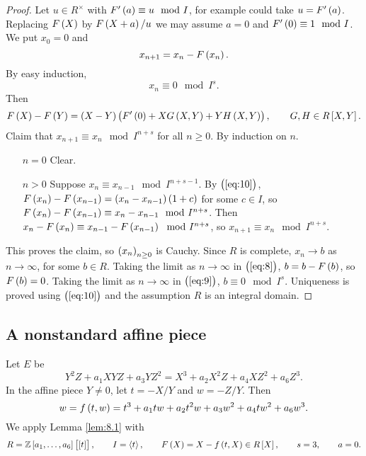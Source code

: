 \begin{proof}
Let $ u \in R^\times $ with $ F'\br{a} \equiv u \mod I $, for example could take $ u = F'\br{a} $. Replacing $ F\br{X} $ by $ F\br{X + a} / u $ we may assume $ a = 0 $ and $ F'\br{0} \equiv 1 \mod I $. We put $ x_0 = 0 $ and
\begin{equation}
\label{eq:8}
x_{n + 1} = x_n - F\br{x_n}.
\end{equation}
By easy induction,
\begin{equation}
\label{eq:9}
x_n \equiv 0 \mod I^s.
\end{equation}
Then
\begin{equation}
\label{eq:10}
F\br{X} - F\br{Y} = \br{X - Y}\br{F'\br{0} + XG\br{X, Y} + YH\br{X, Y}}, \qquad G, H \in R\sbr{X, Y}.
\end{equation}
Claim that $ x_{n + 1} \equiv x_n \mod I^{n + s} $ for all $ n \ge 0 $. By induction on $ n $.
\begin{itemize}[leftmargin=0.5in]
\item[$ n = 0 $] Clear.
\item[$ n > 0 $] Suppose $ x_n \equiv x_{n - 1} \mod I^{n + s - 1} $. By $ \br{\ref{eq:10}} $, $ F\br{x_n} - F\br{x_{n - 1}} = \br{x_n - x_{n - 1}}\br{1 + c} $ for some $ c \in I $, so $ F\br{x_n} - F\br{x_{n - 1}} \equiv x_n - x_{n - 1} \mod I^{n + s} $. Then $ x_n - F\br{x_n} \equiv x_{n - 1} - F\br{x_{n - 1}} \mod I^{n + s} $, so $ x_{n + 1} \equiv x_n \mod I^{n + s} $.
\end{itemize}
This proves the claim, so $ \br{x_n}_{n \ge 0} $ is Cauchy. Since $ R $ is complete, $ x_n \to b $ as $ n \to \infty $, for some $ b \in R $. Taking the limit as $ n \to \infty $ in $ \br{\ref{eq:8}} $, $ b = b - F\br{b} $, so $ F\br{b} = 0 $. Taking the limit as $ n \to \infty $ in $ \br{\ref{eq:9}} $, $ b \equiv 0 \mod I^s $. Uniqueness is proved using $ \br{\ref{eq:10}} $ and the assumption $ R $ is an integral domain.
\end{proof}

\subsection{A nonstandard affine piece}

Let $ E $ be
$$ Y^2Z + a_1XYZ + a_3YZ^2 = X^3 + a_2X^2Z + a_4XZ^2 + a_6Z^3. $$
In the affine piece $ Y \ne 0 $, let $ t = -X / Y $ and $ w = -Z / Y $. Then
$$ w = f\br{t, w} = t^3 + a_1tw + a_2t^2w + a_3w^2 + a_4tw^2 + a_6w^3. $$
We apply Lemma \ref{lem:8.1} with
$$ R = \ZZ\sbr{a_1, \dots, a_6}\sbr{\sbr{t}}, \qquad I = \abr{t}, \qquad F\br{X} = X - f\br{t, X} \in R\sbr{X}, \qquad s = 3, \qquad a = 0. $$

